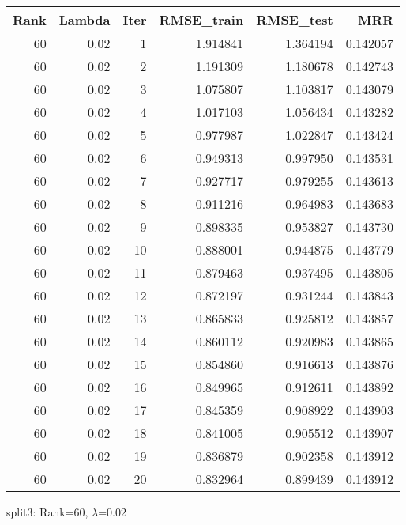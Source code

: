 \begin{tabular}{rrrrrr}
\toprule
 Rank &  Lambda &  Iter &  RMSE\_train &  RMSE\_test &       MRR \\
\midrule
   60 &    0.02 &     1 &    1.914841 &   1.364194 &  0.142057 \\
   60 &    0.02 &     2 &    1.191309 &   1.180678 &  0.142743 \\
   60 &    0.02 &     3 &    1.075807 &   1.103817 &  0.143079 \\
   60 &    0.02 &     4 &    1.017103 &   1.056434 &  0.143282 \\
   60 &    0.02 &     5 &    0.977987 &   1.022847 &  0.143424 \\
   60 &    0.02 &     6 &    0.949313 &   0.997950 &  0.143531 \\
   60 &    0.02 &     7 &    0.927717 &   0.979255 &  0.143613 \\
   60 &    0.02 &     8 &    0.911216 &   0.964983 &  0.143683 \\
   60 &    0.02 &     9 &    0.898335 &   0.953827 &  0.143730 \\
   60 &    0.02 &    10 &    0.888001 &   0.944875 &  0.143779 \\
   60 &    0.02 &    11 &    0.879463 &   0.937495 &  0.143805 \\
   60 &    0.02 &    12 &    0.872197 &   0.931244 &  0.143843 \\
   60 &    0.02 &    13 &    0.865833 &   0.925812 &  0.143857 \\
   60 &    0.02 &    14 &    0.860112 &   0.920983 &  0.143865 \\
   60 &    0.02 &    15 &    0.854860 &   0.916613 &  0.143876 \\
   60 &    0.02 &    16 &    0.849965 &   0.912611 &  0.143892 \\
   60 &    0.02 &    17 &    0.845359 &   0.908922 &  0.143903 \\
   60 &    0.02 &    18 &    0.841005 &   0.905512 &  0.143907 \\
   60 &    0.02 &    19 &    0.836879 &   0.902358 &  0.143912 \\
   60 &    0.02 &    20 &    0.832964 &   0.899439 &  0.143912 \\
\bottomrule
\end{tabular}

\caption{split3: Rank=60, $\lambda$=0.02}
